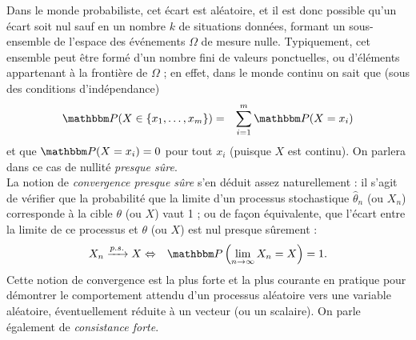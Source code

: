 Dans le monde probabiliste, cet \'ecart est al\'eatoire, et il est donc possible qu'un \'ecart soit nul sauf en un nombre $k$ de situations donn\'ees,  formant un sous-ensemble de l'espace des \'ev\'enements $\Omega$ de mesure nulle. Typiquement, cet ensemble peut \^etre form\'e d'un nomb\-re fini de valeurs ponctuelles,  ou d'\'el\'ements appartenant \`a la fronti\`ere de $\Omega$ ; en effet, dans le monde continu on sait que (sous des conditions d'ind\'ependance)
\begin{eqnarray*}
\Pm(X\in\{x_1,\ldots,x_m\}) & = & \sum\limits_{i=1}^m \Pm(X=x_i)
\end{eqnarray*}
et que $\Pm(X=x_i)=0$ pour tout $x_i$ (puisque $X$ est continu). On parlera dans ce cas de nullit\'e {\it presque s\^ure}.   \\

La notion de {\it convergence presque s\^ure} s'en d\'eduit assez naturellement : il s'agit de v\'erifier que la probabilit\'e que la limite d'un processus stochastique $\hat\theta_n$ (ou $X_n$) corresponde \`a la cible $\theta$ (ou $X$) vaut 1 ; ou de fa\c con \'equivalente, que  l'\'ecart entre la limite de ce processus et $\theta$ (ou $X$) est nul presque s\^urement :
\begin{eqnarray*}
X_n \xrightarrow{p.s.} X & \Leftrightarrow & \Pm\left(\lim_{n\to\infty} X_n = X\right) = 1.
\end{eqnarray*}
Cette notion de convergence est la plus forte et la plus courante en pratique pour d\'emontrer le comportement attendu d'un processus al\'eatoire vers une variable al\'eatoire, \'eventuellement r\'eduite \`a un vecteur (ou un scalaire). On parle \'egalement de {\it consistance forte}\footnotemark[1].  \\


